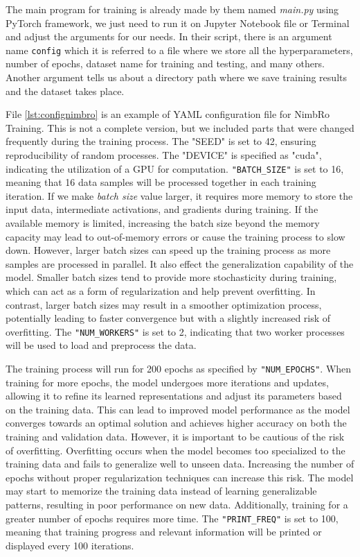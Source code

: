 The main program for training is already made by them named \emph{main.py} using PyTorch framework, we just need to run it on Jupyter Notebook file or Terminal and adjust the arguments for our needs.
In their script, there is an argument name \verb|config| which it is referred to a file where we store all the hyperparameters, number of epochs, dataset name for training and testing, and many others. 
Another argument tells us about a directory path where we save training results and the dataset takes place.

File \ref{lst:confignimbro} is an example of YAML configuration file for NimbRo Training. This is not a complete version, but we included parts that were changed frequently during the training process.
The "SEED" is set to 42, ensuring reproducibility of random processes. The "DEVICE" is specified as "cuda", indicating the utilization of a GPU for computation.
\verb|"BATCH_SIZE"| is set to 16, meaning that 16 data samples will be processed together in each training iteration. If we make \emph{batch size} value larger, it requires more memory to store the input data, intermediate activations, and gradients during training.
If the available memory is limited, increasing the batch size beyond the memory capacity may lead to out-of-memory errors or cause the training process to slow down.
However, larger batch sizes can speed up the training process as more samples are processed in parallel. It also effect the generalization capability of the model.
Smaller batch sizes tend to provide more stochasticity during training, which can act as a form of regularization and help prevent overfitting. In contrast, larger batch sizes may result in a smoother optimization process, potentially leading to faster convergence but with a slightly increased risk of overfitting.
The \verb|"NUM_WORKERS"| is set to 2, indicating that two worker processes will be used to load and preprocess the data.

The training process will run for 200 epochs as specified by \verb|"NUM_EPOCHS"|. When training for more epochs, the model undergoes more iterations and updates, allowing it to refine its learned representations and adjust its parameters based on the training data.
This can lead to improved model performance as the model converges towards an optimal solution and achieves higher accuracy on both the training and validation data. However, it is important to be cautious of the risk of overfitting. Overfitting occurs when the model becomes too specialized to the training data and fails to generalize well to unseen data.
Increasing the number of epochs without proper regularization techniques can increase this risk. The model may start to memorize the training data instead of learning generalizable patterns, resulting in poor performance on new data. Additionally, training for a greater number of epochs requires more time.
The \verb|"PRINT_FREQ"| is set to 100, meaning that training progress and relevant information will be printed or displayed every 100 iterations.

